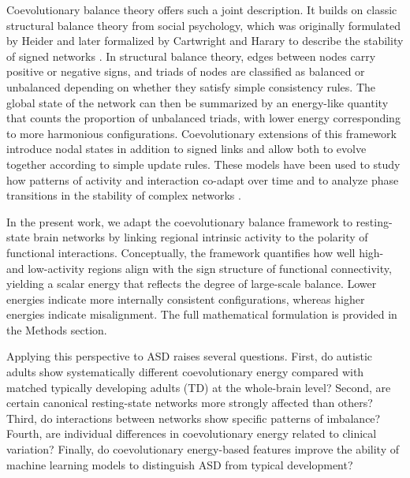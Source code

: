 \documentclass[10pt,letterpaper]{article}
\begin{document}
Coevolutionary balance theory offers such a joint description. It builds on classic structural balance
theory from social psychology, which was originally formulated by Heider and later formalized by
Cartwright and Harary to describe the stability of signed networks \cite{Heider:1946ac,cartwright1956}.
In structural balance theory, edges between nodes carry positive or negative signs, and triads of
nodes are classified as balanced or unbalanced depending on whether they satisfy simple consistency
rules. The global state of the network can then be summarized by an energy-like quantity that counts
the proportion of unbalanced triads, with lower energy corresponding to more harmonious
configurations. Coevolutionary extensions of this framework introduce nodal states in addition to
signed links and allow both to evolve together according to simple update rules. These models have
been used to study how patterns of activity and interaction co-adapt over time and to analyze phase
transitions in the stability of complex networks \cite{Kargaran:2021he,GhanbarzadehNoudehi2022}.

In the present work, we adapt the coevolutionary balance framework to resting-state brain networks
by linking regional intrinsic activity to the polarity of functional interactions. Conceptually,
the framework quantifies how well high- and low-activity regions align with the sign structure of
functional connectivity, yielding a scalar energy that reflects the degree of large-scale balance.
Lower energies indicate more internally consistent configurations, whereas higher energies indicate
misalignment. The full mathematical formulation is provided in the Methods section.

Applying this perspective to ASD raises several questions. First, do autistic adults show
systematically different coevolutionary energy compared with matched typically developing adults
(TD) at the whole-brain level? Second, are certain canonical resting-state networks more strongly
affected than others? Third, do interactions between networks show specific patterns of imbalance?
Fourth, are individual differences in coevolutionary energy related to clinical variation? Finally,
do coevolutionary energy-based features improve the ability of machine learning models to distinguish
ASD from typical development?
\end{document}
